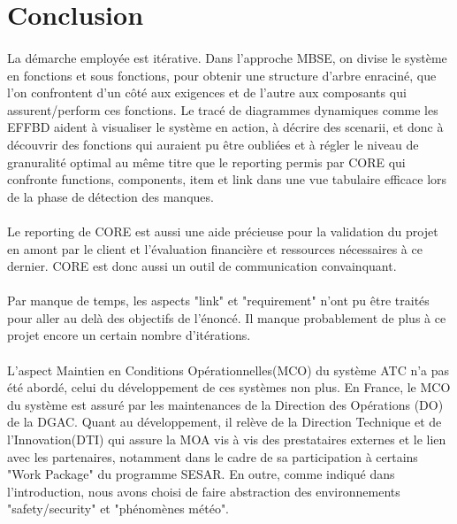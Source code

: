 \section*{Conclusion}


\paragraph{}
La démarche employée est itérative. Dans l'approche MBSE, on divise le système en fonctions et sous fonctions, pour obtenir une structure d'arbre enraciné, que l'on confrontent d'un côté aux exigences et de l'autre aux composants qui assurent/perform ces fonctions. Le tracé de diagrammes dynamiques comme les EFFBD aident à visualiser le système en action, à décrire des scenarii, et donc à découvrir des fonctions qui auraient pu être oubliées et à régler le niveau de granuralité optimal au même titre que le reporting permis par CORE qui confronte functions, components, item et link dans une vue tabulaire efficace lors de la phase de détection des manques.  

\paragraph{}
Le reporting de CORE est aussi une aide précieuse pour la validation du projet en amont par le client et l'évaluation financière et ressources nécessaires à ce dernier. CORE est donc aussi un outil de communication convainquant.

\paragraph{}
Par manque de temps, les aspects "link" et "requirement" n'ont pu être traités pour aller au delà des objectifs de l'énoncé. Il manque probablement de plus à ce projet encore un certain nombre d'itérations. 

\paragraph{}
L'aspect Maintien en Conditions Opérationnelles(MCO) du système ATC n'a pas été abordé, celui du développement de ces systèmes non plus. En France, le MCO du système est assuré par les maintenances de la Direction des Opérations (DO) de la DGAC. Quant au développement, il relève de la Direction Technique et de l'Innovation(DTI) qui assure la MOA vis à vis des prestataires externes et le lien avec les partenaires, notamment dans le cadre de sa participation à certains "Work Package" du programme SESAR. En outre, comme indiqué dans l'introduction, nous avons choisi de faire abstraction des environnements "safety/security" et "phénomènes météo".   

